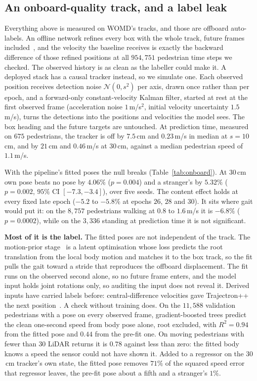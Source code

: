 \documentclass[conference]{IEEEtran}
\begin{document}
\subsection{An onboard-quality track, and a label leak}
\label{sec:onboard}
Everything above is measured on WOMD's tracks, and those are offboard
auto-labels. An offline network refines every box with the whole track, future
frames included~\cite{ettinger2021waymo,qi2021offboard}, and the velocity the
baseline receives is exactly the backward difference of those refined positions
at all $954{,}751$ pedestrian time steps we checked. The observed history is as
clean as the labeller could make it. A deployed stack has a causal tracker
instead, so we simulate one. Each observed position receives detection noise
$\mathcal{N}(0,s^2)$ per axis, drawn once rather than per epoch, and a
forward-only constant-velocity Kalman filter, started at rest at the first
observed frame (acceleration
noise $1$\,m/s$^2$, initial velocity uncertainty $1.5$\,m/s), turns the
detections into the positions and velocities the model sees. The box heading and
the future targets are untouched. At prediction time, measured on $675$
pedestrians, the tracker is off
by $7.5$\,cm and $0.23$\,m/s in median at $s{=}10$\,cm, and by $21$\,cm and
$0.46$\,m/s at $30$\,cm, against a median pedestrian speed of $1.1$\,m/s.

With the pipeline's fitted poses the null breaks (Table~\ref{tab:onboard}). At
$30$\,cm own pose beats no pose by $4.06\%$ ($p{=}0.004$) and a stranger's by
$5.32\%$ ($p{=}0.002$, $95\%$ CI $[-7.3,-3.4]$), over five seeds.
The content effect holds at every fixed late epoch
($-5.2$ to $-5.8\%$ at epochs $26$, $28$ and $30$). It
sits where gait would put it: on the $8{,}757$ pedestrians walking at $0.8$ to
$1.6$\,m/s it is $-6.8\%$ ($p{=}0.0002$), while on the $3{,}336$ standing at
prediction time it is not significant.

\textbf{Most of it is the label.} The fitted poses are not independent of the
track. The motion-prior stage~\cite{he2022nemf} is a latent optimisation whose
loss predicts the root translation from the local body motion and matches it to
the box track, so the fit pulls the gait toward a stride that reproduces the
offboard displacement. The fit runs on the observed second alone, so no future frame enters, and
the model input holds joint rotations only, so auditing the input does not
reveal it.
Derived inputs have carried labels before: central-difference velocities gave
Trajectron++ the next position~\cite{trajectron2021derivatives}. A check
without training does. On the $11{,}588$ validation pedestrians with a pose on every observed frame, gradient-boosted
trees predict the clean one-second speed from body pose alone, root excluded,
with $R^2{=}0.94$ from the fitted pose and $0.44$ from the pre-fit one. On
moving pedestrians with fewer than $30$ LiDAR returns it is $0.78$ against less
than zero: the fitted body knows a speed the sensor could not have shown it.
Added to a regressor on the $30$\,cm tracker's own state, the fitted pose
removes $71\%$ of the squared speed error that regressor leaves, the pre-fit
pose about a fifth and a stranger's $1\%$.
\end{document}
